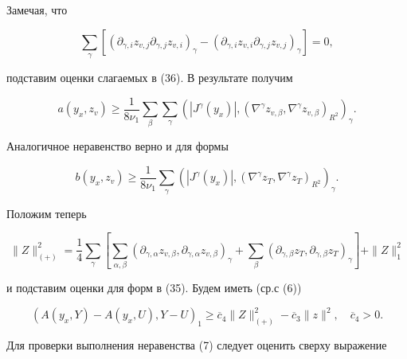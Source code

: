 Замечая, что 


$$ 


\sum_\gamma[( 


\partial_{\gamma,i}z_{v,j}\partial_{\gamma,j}z_{v,i})_\gamma - 


(\partial_{\gamma,i}z_{v,i}\partial_{\gamma,j}z_{v,j})_\gamma] =0,


$$ 


подставим оценки слагаемых в (36). В результате получим 


$$ 


a(y_x,z_v)\ge \frac{1}{8\nu_1}\sum_\beta\sum_\gamma 


(|J^\gamma(y_x)|,(\nabla^\gamma z_{v,\beta},\nabla^\gamma z_{v,\beta} 


)_{R^2})_\gamma. 


$$ 


Аналогичное неравенство верно и для формы 


$$ 


b(y_x,z_v)\ge \frac{1}{8\nu_1}\sum_\gamma 


(|J^\gamma(y_x)|,(\nabla^\gamma z_T,\nabla^\gamma z_T)_{R^2})_\gamma. 


$$ 


 


Положим теперь 


$$ 


\|Z\|^2_{(+)}=\frac14\sum_\gamma\left[\sum_{\alpha,\beta} 


(\partial_{\gamma,\alpha}z_{v,\beta}, 


\partial_{\gamma,\alpha}z_{v,\beta})_\gamma + \sum_\beta 


(\partial_{\gamma,\beta}z_T, \partial_{\gamma,\beta}z_T)_\gamma 


\right]+\|Z\|^2_1 


$$ 


и подставим оценки для форм в (35). Будем иметь (ср.с (6)) 


$$ 


(A(y_x,Y)-A(y_x,U),Y-U)_1 \ge \overline c_4 \|Z\|^2_{(+)} 


-\overline c_3\|z\|^2,\quad \overline c_4>0. 


$$ 


Для проверки выполнения неравенства (7) следует оценить сверху выражение 


